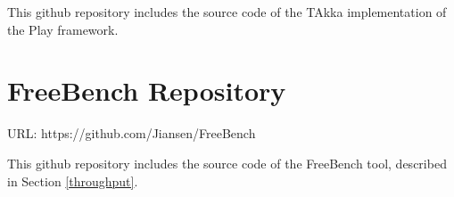 This github repository includes the source code of the TAkka 
implementation of the Play framework.


\section{FreeBench Repository}
URL: https://github.com/Jiansen/FreeBench

This github repository includes the source code of the FreeBench tool, 
described in Section \ref{throughput}.


\begin{comment}
\section{Rejuvenation Repository}

URL: https://github.com/Jiansen/Rejuvenation


This github repository includes the source code of the TAkka library, testing 
examples except the ATM example \citep{atmprivate} and the elevator controller 
example \citep{quviq}, and scripts for running scalability tests on Beowulf 
cluster.

\end{comment}